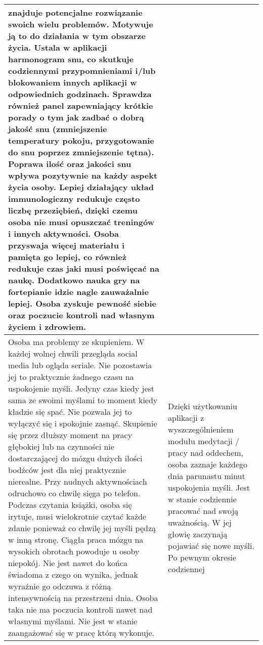 \documentclass[12pt, letterpaper]{article}
\begin{document}
\begin{center}
\begin{longtable}{ | m{} | m{} | }
            znajduje potencjalne rozwiązanie swoich wielu problemów. Motywuje ją
            to do działania w tym obszarze życia. Ustala w aplikacji harmonogram
            snu, co skutkuje codziennymi przypomnieniami i/lub blokowaniem
            innych aplikacji w odpowiednich godzinach. Sprawdza również panel
            zapewniający krótkie porady o tym jak zadbać o dobrą jakość snu
            (zmniejszenie temperatury pokoju, przygotowanie do snu poprzez
            zmniejszenie tętna). Poprawa ilość oraz jakości snu wpływa
            pozytywnie na każdy aspekt życia osoby. Lepiej działający układ
            immunologiczny redukuje często liczbę przeziębień, dzięki czemu
            osoba nie musi opuszczać treningów i innych aktywności. Osoba
            przyswaja więcej materiału i pamięta go lepiej, co również redukuje
            czas jaki musi poświęcać na naukę. Dodatkowo nauka gry na
            fortepianie idzie nagle zauważalnie lepiej. Osoba zyskuje pewność
            siebie oraz poczucie kontroli nad własnym życiem i zdrowiem. \\
            \hline
            Osoba ma problemy ze skupieniem. W każdej wolnej chwili przegląda
            social  media lub ogląda seriale. Nie pozostawia jej to praktycznie
            żadnego czasu na uspokojenie myśli. Jedyny czas kiedy jest sama ze
            swoimi myślami to moment kiedy kładzie się spać. Nie pozwala jej to
            wyłączyć się i spokojnie zasnąć. Skupienie się przez dłuższy moment
            na pracy głębokiej lub na czynności nie dostarczającej do mózgu
            dużych ilości bodźców jest dla niej praktycznie nierealne. Przy
            nudnych aktywnościach odruchowo co chwilę sięga po telefon. Podczas
            czytania książki, osoba się irytuje, musi wielokrotnie czytać każde
            zdanie ponieważ co chwilę jej myśli pędzą w inną stronę. Ciągła
            praca mózgu na wysokich obrotach powoduje u osoby niepokój. Nie jest
            nawet do końca świadoma z czego on wynika, jednak wyraźnie go
            odczuwa z różną intensywnością na przestrzeni dnia. Osoba taka nie
            ma poczucia kontroli nawet nad własnymi myślami. Nie jest w stanie
            zaangażować się w pracę którą wykonuje. & Dzięki użytkowaniu
            aplikacji z wyszczególnieniem modułu medytacji / pracy nad oddechem,
            osoba zaznaje każdego dnia parunastu minut uspokojenia myśli. Jest w
            stanie codziennie pracować nad swoją uważnością. W jej głowię
            zaczynają pojawiać się nowe myśli. Po pewnym okresie codziennej

\end{longtable}
\end{center}
\end{document}
